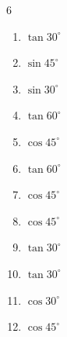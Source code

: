 \begin{multicols}{6}
\begin{enumerate}
  \item $\displaystyle \tan{30^\circ}$


  \item $\displaystyle \sin{45^\circ}$


  \item $\displaystyle \sin{30^\circ}$


  \item $\displaystyle \tan{60^\circ}$


  \item $\displaystyle \cos{45^\circ}$


  \item $\displaystyle \tan{60^\circ}$


  \item $\displaystyle \cos{45^\circ}$


  \item $\displaystyle \cos{45^\circ}$


  \item $\displaystyle \tan{30^\circ}$


  \item $\displaystyle \tan{30^\circ}$


  \item $\displaystyle \cos{30^\circ}$


  \item $\displaystyle \cos{45^\circ}$


\columnbreak %


\end{enumerate}
\end{multicols}
